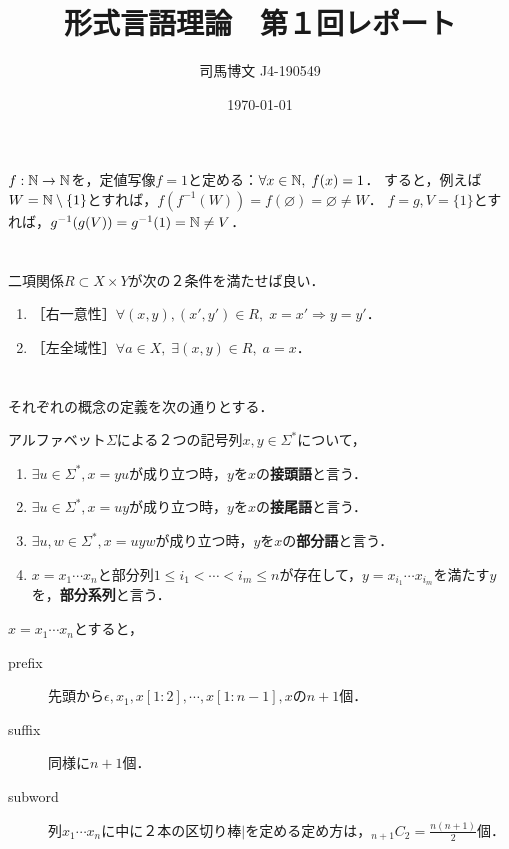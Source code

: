 \documentclass[uplatex, 12pt, dvipdfmx]{jsarticle}
\title{形式言語理論　第１回レポート}
\author{司馬博文 J4-190549}
\date{\today}
\begin{document}
\maketitle

\section{ }

$f:\mathbb{N}\to\mathbb{N}$を，定値写像$f=1$と定める：$\forall x\in \mathbb{N},\;f(x)=1$．
すると，例えば$W=\mathbb{N}\setminus\{1\}$とすれば，$f(f^{-1}(W))=f(\varnothing)=\varnothing\ne W$．
$f=g, V=\{1\}$とすれば，$g^{-1}(g(V))=g^{-1}(1)=\mathbb{N}\ne V$．

\section{ }

二項関係$R\subset X\times Y$が次の２条件を満たせば良い．
\begin{enumerate}
    \item ［右一意性］$\forall (x,y),(x',y')\in R,\; x=x'\Rightarrow y=y'$．
    \item ［左全域性］$\forall a\in X,\; \exists (x,y)\in R,\; a=x$．
\end{enumerate}

\section{ }

それぞれの概念の定義を次の通りとする．
\begin{definition*}
    アルファベット$\Sigma$による２つの記号列$x,y\in\Sigma^*$について，
    \begin{enumerate}
        \item $\exists u\in\Sigma^*, x=yu$が成り立つ時，$y$を$x$の\textbf{接頭語}と言う．
        \item $\exists u\in\Sigma^*,x=uy$が成り立つ時，$y$を$x$の\textbf{接尾語}と言う．
        \item $\exists u,w\in\Sigma^*,x=uyw$が成り立つ時，$y$を$x$の\textbf{部分語}と言う．
        \item $x=x_1\cdots x_n$と部分列$1\le i_1<\cdots<i_m\le n$が存在して，$y=x_{i_1}\cdots x_{i_m}$を満たす$y$を，\textbf{部分系列}と言う．
    \end{enumerate}
\end{definition*}
$x=x_1\cdots x_n$とすると，
\begin{description}
    \item[prefix] 先頭から$\epsilon,x_1,x[1:2],\cdots,x[1:n-1],x$の$n+1$個．
    \item[suffix] 同様に$n+1$個．
    \item[subword] 列$x_1\cdots x_n$に中に２本の区切り棒$|$を定める定め方は，${}_{n+1}C_2=\frac{n(n+1)}{2}$個．
\end{description}
\end{document}
